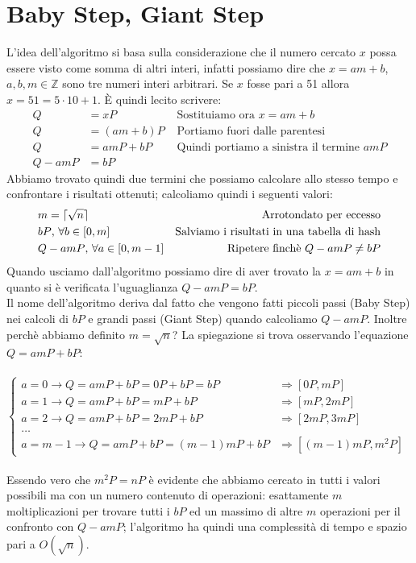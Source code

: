 \documentclass[a4paper,12pt]{tesiinfo}
\DeclarePairedDelimiter\ceil{\lceil}{\rceil}
\begin{document}
\section{Baby Step, Giant Step}
L'idea dell'algoritmo si basa sulla considerazione che il numero cercato $x$ possa essere visto come somma di altri interi, infatti possiamo dire che $x = am+b$, $a, b, m \in \mathbb{Z}$ sono tre numeri interi arbitrari. Se $x$ fosse pari a 51 allora $x = 51 = 5 \cdot 10 + 1$. \`E quindi lecito scrivere:
\begin{align*}
 Q &= xP &\text{ Sostituiamo ora }x = am+b\\
 Q &= (am+b)P &\text{ Portiamo fuori dalle parentesi }\\
 Q &= amP+bP &\text{ Quindi portiamo a sinistra il termine }amP\\
 Q -amP &= bP
\end{align*}
Abbiamo trovato quindi due termini che possiamo calcolare allo stesso tempo e confrontare i risultati ottenuti; calcoliamo quindi i seguenti valori:
\begin{align*}
 &m = \ceil{\sqrt{n}} &\text{Arrotondato per eccesso}\\
 &bP \text{, }\forall b \in [0, m] &\text{Salviamo i risultati in una tabella di hash}\\
 &Q -amP \text{, }\forall a \in [0, m-1] &\text{Ripetere finch\`e } Q -amP \ne bP
\end{align*}
Quando usciamo dall'algoritmo possiamo dire di aver trovato la $x = am+b$ in quanto si \`e verificata l'uguaglianza $Q -amP = bP$.
\\
Il nome dell'algoritmo deriva dal fatto che vengono fatti piccoli passi (Baby Step) nei calcoli di $bP$ e grandi passi (Giant Step) quando calcoliamo $Q-amP$. Inoltre perch\`e abbiamo definito $m = \sqrt{n}$? La spiegazione si trova osservando l'equazione $Q = amP+bP$:\\
\\
$\begin{cases}
 a = 0 \to Q=amP+bP=0P+bP=bP &\Rightarrow [0P, mP]\\
 a = 1 \to Q=amP+bP=mP+bP &\Rightarrow [mP, 2mP]\\
 a = 2 \to Q=amP+bP=2mP+bP &\Rightarrow [2mP, 3mP]\\
 \ldots\\
 a = m-1 \to Q=amP+bP=(m-1)mP+bP &\Rightarrow [(m-1)mP, m^2P]
\end{cases}$
\\
\\
Essendo vero che $m^2P=nP$ \`e evidente che abbiamo cercato in tutti i valori possibili ma con un numero contenuto di operazioni: esattamente $m$ moltiplicazioni per trovare tutti i $bP$ ed un massimo di altre $m$ operazioni per il confronto con $Q-amP$; l'algoritmo ha quindi una complessit\`a di tempo e spazio pari a $O(\sqrt{n})$.
\end{document}
